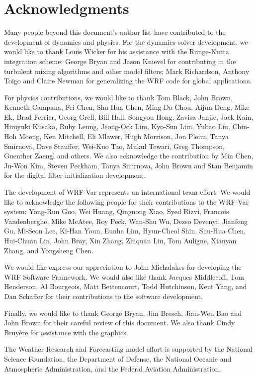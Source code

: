 \chapter*{Acknowledgments}

\hskip 15pt 
Many people beyond this document's author list have
contributed to the development of dynamics and physics.  
For the dynamics solver
development, we would like to thank Louis Wicker for his assistance with
the Runge-Kutta integration scheme; George Bryan and Jason Knievel
for contributing in the turbulent mixing algorithms and other model filters;
Mark Richardson, Anthony Toigo and Claire Newman for generalizing the
WRF code for global applications. 

\vskip 10pt
For physics contributions, we would like to thank Tom Black, John Brown, Kenneth Campana, 
Fei Chen, Shu-Hua Chen, Ming-Da Chou, Aijun Deng, Mike Ek, Brad Ferrier, Georg Grell, Bill
Hall, Songyou Hong, Zavisa Janjic, Jack Kain, Hiroyuki Kusaka, 
Ruby Leung, Jeong-Ock Lim, Kyo-Sun Lim, Yubao Liu, Chin-Hoh Moeng,
Ken Mitchell, Eli Mlawer, Hugh Morrison, Jon Pleim, Tanya Smirnova, Dave Stauffer, 
Wei-Kuo Tao, Mukul Tewari, Greg Thompson, Guenther Zaengl and others.
We also acknowledge the contribution by Min Chen, Ju-Won Kim, Steven Peckham, Tanya Smirnova,
John Brown and Stan Benjamin for the digital filter initialization development.

\vskip 10pt
The development of WRF-Var represents an international team effort. 
We would like to acknowledge the following people for their
contributions to the WRF-Var system: Yong-Run Guo, Wei Huang, Qingnong
Xiao, Syed Rizvi, Francois Vandenberghe, Mike McAtee, Roy Peck, Wan-Shu Wu,
Dezso Devenyi, Jianfeng Gu, Mi-Seon Lee, Ki-Han Youn, Eunha Lim, Hyun-Cheol Shin,
Shu-Hua Chen, Hui-Chuan Lin, John Bray, Xin Zhang, Zhiquan Liu,
Tom Auligne, Xianyan Zhang, and Yongsheng Chen.

\vskip 10pt
We would like express our appreciation to John Michalakes for developing
the WRF Software Framework.  We would also like thank Jacques Middlecoff, 
Tom Henderson, Al Bourgeois, Matt Bettencourt, Todd Hutchinson, Kent Yang,
and Dan Schaffer for their contributions to the software development. 

\vskip 10pt
Finally, we would like to thank George Bryan,
Jim Bresch, Jian-Wen Bao and John Brown
for their careful review of this document.  We also thank 
Cindy Bruy\`ere for assistance with the graphics.

\vskip 10pt
The Weather Research and Forecasting model effort
is supported by the National Science Foundation, the Department of
Defense, the National Oceanic and Atmospheric Administration, and the
Federal Aviation Administration.

